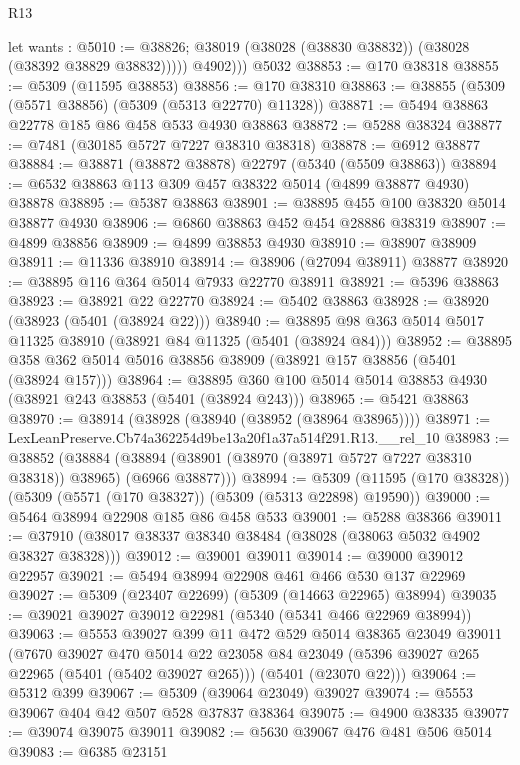 \begin{lexlean}{R13}
\begin{coremodule}
            let wants : @5010 := @38826;
            @38019 (@38028 (@38830 @38832)) (@38028 (@38392 @38829 @38832)))))
          @4902)))
    @5032
@38853 := @170 @38318
@38855 := @5309 (@11595 @38853)
@38856 := @170 @38310
@38863 := @38855 (@5309 (@5571 @38856) (@5309 (@5313 @22770) @11328))
@38871 := @5494 @38863 @22778 @185 @86 @458 @533 @4930 @38863
@38872 := @5288 @38324
@38877 := @7481 (@30185 @5727 @7227 @38310 @38318)
@38878 := @6912 @38877
@38884 := @38871 (@38872 @38878) @22797 (@5340 (@5509 @38863))
@38894 := @6532 @38863 @113 @309 @457 @38322 @5014 (@4899 @38877 @4930) @38878
@38895 := @5387 @38863
@38901 := @38895 @455 @100 @38320 @5014 @38877 @4930
@38906 := @6860 @38863 @452 @454 @28886 @38319
@38907 := @4899 @38856
@38909 := @4899 @38853 @4930
@38910 := @38907 @38909
@38911 := @11336 @38910
@38914 := @38906 (@27094 @38911) @38877
@38920 := @38895 @116 @364 @5014 @7933 @22770 @38911
@38921 := @5396 @38863
@38923 := @38921 @22 @22770
@38924 := @5402 @38863
@38928 := @38920 (@38923 (@5401 (@38924 @22)))
@38940 := @38895 @98 @363 @5014 @5017 @11325 @38910 (@38921 @84 @11325 (@5401 (@38924 @84)))
@38952 := @38895 @358 @362 @5014 @5016 @38856 @38909 (@38921 @157 @38856 (@5401 (@38924 @157)))
@38964 := @38895 @360 @100 @5014 @5014 @38853 @4930 (@38921 @243 @38853 (@5401 (@38924 @243)))
@38965 := @5421 @38863
@38970 := @38914 (@38928 (@38940 (@38952 (@38964 @38965))))
@38971 := LexLeanPreserve.Cb74a362254d9be13a20f1a37a514f291.R13.__rel_10
@38983 := @38852
    (@38884 (@38894 (@38901 (@38970 (@38971 @5727 @7227 @38310 @38318)) @38965) (@6966 @38877)))
@38994 := @5309 (@11595 (@170 @38328)) (@5309 (@5571 (@170 @38327)) (@5309 (@5313 @22898) @19590))
@39000 := @5464 @38994 @22908 @185 @86 @458 @533
@39001 := @5288 @38366
@39011 := @37910 (@38017 @38337 @38340 @38484 (@38028 (@38063 @5032 @4902 @38327 @38328)))
@39012 := @39001 @39011
@39014 := @39000 @39012 @22957
@39021 := @5494 @38994 @22908 @461 @466 @530 @137 @22969
@39027 := @5309 (@23407 @22699) (@5309 (@14663 @22965) @38994)
@39035 := @39021 @39027 @39012 @22981 (@5340 (@5341 @466 @22969 @38994))
@39063 := @5553
    @39027
    @399
    @11
    @472
    @529
    @5014
    @38365
    @23049
    @39011
    (@7670
      @39027
      @470
      @5014
      @22
      @23058
      @84
      @23049
      (@5396 @39027 @265 @22965 (@5401 (@5402 @39027 @265)))
      (@5401 (@23070 @22)))
@39064 := @5312 @399
@39067 := @5309 (@39064 @23049) @39027
@39074 := @5553 @39067 @404 @42 @507 @528 @37837 @38364
@39075 := @4900 @38335
@39077 := @39074 @39075 @39011
@39082 := @5630 @39067 @476 @481 @506 @5014
@39083 := @6385 @23151

\end{coremodule}
\end{lexlean}
